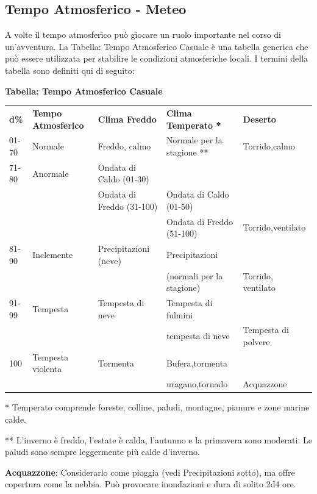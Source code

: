 \documentclass[a4paper,11pt,twoside,openany]{book}
\begin{document}
\subsection{Tempo Atmosferico - Meteo}

\label{tempo-atmosferico---meteo}

A volte il tempo atmosferico può giocare un ruolo importante nel corso di un'avventura. La Tabella: Tempo Atmosferico Casuale è una tabella generica che può essere utilizzata per stabilire le condizioni atmosferiche locali. I termini della tabella sono definiti qui di seguito:

\bigskip

\textbf{Tabella: Tempo Atmosferico Casuale}

\begin{tabularx}{0.95\textwidth}{lXXXX}
	\toprule
	\textbf{d\%} & \textbf{Tempo Atmosferico} & \textbf{Clima Freddo}& \textbf{Clima Temperato {*}}   & \textbf{Deserto}\\
	01-70   & Normale& Freddo, calmo   & Normale per la stagione {*}{*} & Torrido,calmo\\
	71-80   & Anormale    & Ondata di Caldo (01-30)   \\
	   &   & Ondata di Freddo (31-100) & Ondata di Caldo (01-50)\\
	   &   &  & Ondata di Freddo (51-100) & Torrido,ventilato\\
	81-90   & Inclemente  & Precipitazioni (neve)& Precipitazioni    \\
	   &   &  & (normali per la stagione) & Torrido, ventilato\\
	91-99   & Tempesta    & Tempesta di neve& Tempesta di fulmini    \\
	   &   &  & tempesta di neve& Tempesta di polvere\\
	100& Tempesta violenta& Tormenta   & Bufera,tormenta   \\
	   &   &  & uragano,tornado & Acquazzone\\
\end{tabularx}

* Temperato comprende foreste, colline, paludi, montagne, pianure
e zone marine calde.

** L'inverno è freddo, l'estate è calda, l'autunno e la primavera sono moderati. Le paludi sono sempre leggermente più calde d'inverno.

\bigskip

\textbf{Acquazzone}: Considerarlo come pioggia (vedi Precipitazioni sotto), ma offre copertura come la nebbia. Può provocare inondazioni e dura di solito 2d4 ore.
\end{document}
